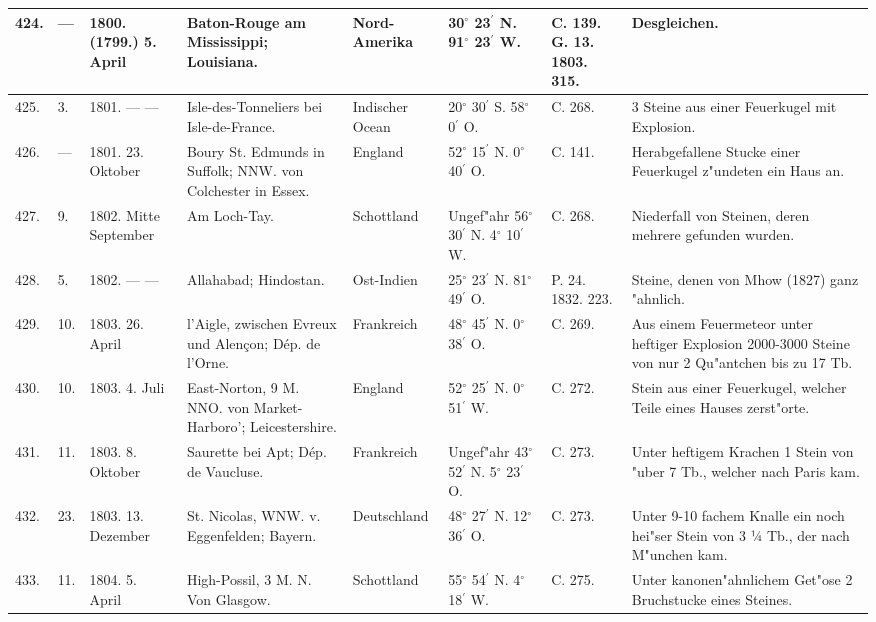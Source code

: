 \documentclass[a4paper, 8pt, oneside, polutonikogreek, german]{article}
\begin{document}
\begin{center}
\begin{longtable}{| p{4mm} | p{2mm} | p{15mm} | p{25mm} | p{16mm} | p{12mm} | p{13mm} | p{20mm} |}
        424. & --- & 1800. (1799.) 5. April & Baton-Rouge am Mississippi; Louisiana. & Nord-Amerika & 30$^\circ$ 23$^\prime$ N. 91$^\circ$ 23$^\prime$ W. & C. 139. G. 13. 1803. 315. & Desgleichen. \\ \hline
        425. & 3. & 1801. --- --- & Isle-des-Tonneliers bei Isle-de-France. & Indischer Ocean & 20$^\circ$ 30$^\prime$ S. 58$^\circ$ 0$^\prime$ O. & C. 268. & 3 Steine aus einer Feuerkugel mit Explosion. \\ \hline
        426. & --- & 1801. 23. Oktober & Boury St. Edmunds in Suffolk; NNW. von Colchester in Essex. & England & 52$^\circ$ 15$^\prime$ N. 0$^\circ$ 40$^\prime$ O. & C. 141. & Herabgefallene Stucke einer Feuerkugel z"undeten ein Haus an. \\ \hline
        427. & 9. & 1802. Mitte September & Am Loch-Tay. & Schottland & Ungef"ahr 56$^\circ$ 30$^\prime$ N. 4$^\circ$ 10$^\prime$ W. & C. 268. & Niederfall von Steinen, deren mehrere gefunden wurden. \\ \hline
        428. & 5. & 1802. --- --- & Allahabad; Hindostan. & Ost-Indien & 25$^\circ$ 23$^\prime$ N. 81$^\circ$ 49$^\prime$ O. & P. 24. 1832. 223. & Steine, denen von Mhow (1827) ganz "ahnlich. \\ \hline
        429. & 10. & 1803. 26. April & l’Aigle, zwischen Evreux und Alençon; Dép. de l’Orne. & Frankreich & 48$^\circ$ 45$^\prime$ N. 0$^\circ$ 38$^\prime$ O. & C. 269. & Aus einem Feuermeteor unter heftiger Explosion 2000-3000 Steine von nur 2 Qu"antchen bis zu 17 Tb. \\ \hline
        430. & 10. & 1803. 4. Juli & East-Norton, 9 M. NNO. von Market-Harboro’; Leicestershire. & England & 52$^\circ$ 25$^\prime$ N. 0$^\circ$ 51$^\prime$ W. & C. 272. & Stein aus einer Feuerkugel, welcher Teile eines Hauses zerst"orte. \\ \hline
        431. & 11. & 1803. 8. Oktober & Saurette bei Apt; Dép. de Vaucluse. & Frankreich & Ungef"ahr 43$^\circ$ 52$^\prime$ N. 5$^\circ$ 23$^\prime$ O. & C. 273. & Unter heftigem Krachen 1 Stein von "uber 7 Tb., welcher nach Paris kam. \\ \hline
        432. & 23. & 1803. 13. Dezember & St. Nicolas, WNW. v. Eggenfelden; Bayern. & Deutschland & 48$^\circ$ 27$^\prime$ N. 12$^\circ$ 36$^\prime$ O. & C. 273. & Unter 9-10 fachem Knalle ein noch hei"ser Stein von 3 ¼ Tb., der nach M"unchen kam. \\ \hline
        433. & 11. & 1804. 5. April & High-Possil, 3 M. N. Von Glasgow. & Schottland & 55$^\circ$ 54$^\prime$ N. 4$^\circ$ 18$^\prime$ W. & C. 275. & Unter kanonen"ahnlichem Get"ose 2 Bruchstucke eines Steines. \\ \hline

\end{longtable}
\end{center}
\end{document}
